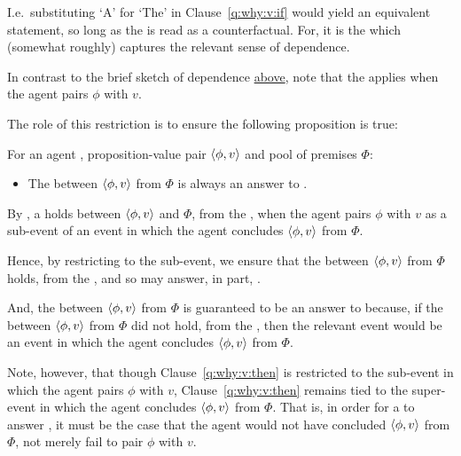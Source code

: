 \begin{note}
{    I.e.\ substituting `A' for `The' in Clause~\ref{q:why:v:if} would yield an equivalent statement, so long as the \qWVitc{} is read as a counterfactual.
  }
  For, it is the \qWVitc{} which (somewhat roughly) captures the relevant sense of dependence.

  In contrast to the brief sketch of dependence \hyperref[dependence:rough]{above}, note that the \qWVitc{} applies when the agent pairs \(\phi\) with \(v\).

  The role of this restriction is to ensure the following proposition is true:

  \begin{proposition}
    \label{prop:ros-always-answer}
    For an agent \vAgent{}, proposition-value pair \(\langle \phi, v \rangle\) and pool of premises \(\Phi\):

    \begin{itemize}
    \item
      The \ros{} between \(\langle \phi, v \rangle\) from \(\Phi\) is always an answer to \qWhyVnP{}.
    \end{itemize}
    \begin{argument}
      By \supportI{}, a \ros{} holds between \(\langle \phi, v \rangle\) and \(\Phi\), from the \agpe{}, when the agent pairs \(\phi\) with \(v\) as a sub-event of an event in which the agent concludes \(\langle \phi, v \rangle\) from \(\Phi\).

      Hence, by restricting \qWhyVnP{} to the sub-event, we ensure that the \ros{} between \(\langle \phi, v \rangle\) from \(\Phi\) holds, from the \agpe{}, and so may answer, in part, \qWhyVnP{}.

  And, the \ros{} between \(\langle \phi, v \rangle\) from \(\Phi\) is guaranteed to be an answer to \qWhyVnP{} because, if the \ros{} between \(\langle \phi, v \rangle\) from \(\Phi\) did not hold, from the \agpe{}, then the relevant event would be an event in which the agent concludes \(\langle \phi, v \rangle\) from \(\Phi\).
    \end{argument}
  \end{proposition}

  Note, however, that though Clause~\ref{q:why:v:then} is restricted to the sub-event in which the agent pairs \(\phi\) with \(v\), Clause~\ref{q:why:v:then} remains tied to the super-event in which the agent concludes \(\langle \phi, v \rangle\) from \(\Phi\).
  That is, in order for a \ros{} to answer \qWhyVnP{}, it must be the case that the agent would not have concluded \(\langle \phi, v \rangle\) from \(\Phi\), not merely fail to pair \(\phi\) with \(v\).


\end{note}

